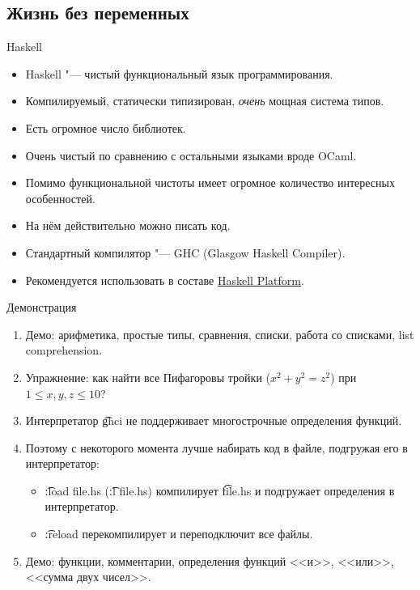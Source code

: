 \subsection{Жизнь без переменных}

\begin{frame}
\end{frame}

\begin{frame}{Haskell}
	\begin{itemize}
		\item Haskell "--- чистый функциональный язык программирования.
		\item Компилируемый, статически типизирован, \textit{очень} мощная система типов.
		\item Есть огромное число библиотек.
		\item Очень чистый по сравнению с остальными языками вроде OCaml.
		\item Помимо функциональной чистоты имеет огромное количество интересных особенностей.
		\item На нём действительно можно писать код.
		\item Стандартный компилятор "--- GHC (Glasgow Haskell Compiler).
		\item Рекомендуется использовать в составе \href{https://www.haskell.org/platform/}{Haskell Platform}.
	\end{itemize}
\end{frame}

\begin{frame}{Демонстрация}
	\begin{enumerate}
		\item Демо: арифметика, простые типы, сравнения, списки, работа со списками, list comprehension.
		\item Упражнение: как найти все Пифагоровы тройки ($x^2 + y^2 = z^2$) при $1 \le x, y, z \le 10$?
		\item Интерпретатор \t{ghci} не поддерживает многострочные определения функций.
		\item Поэтому с некоторого момента лучше набирать код в файле, подгружая его в интерпретатор:
			\begin{itemize}
				\item \t{:load file.hs} (\t{:l file.hs}) компилирует \t{file.hs} и подгружает определения в интерпретатор.
				\item \t{:reload} перекомпилирует и переподключит все файлы.
			\end{itemize}
		\item Демо: функции, комментарии, определения функций <<и>>, <<или>>, <<сумма двух чисел>>.
	\end{enumerate}
\end{frame}

